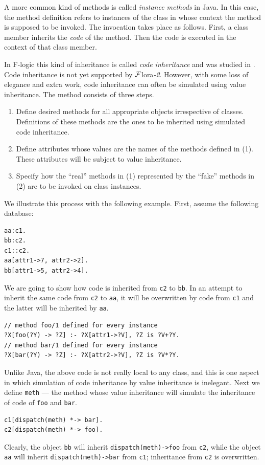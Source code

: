 \documentclass[11pt]{article}
\newcommand{\FLORA}{{\mbox{\sc ${\cal F}${lora}\rm\emph{-2}}}\xspace}
\newcommand{\fl}{\mbox{F-logic}\xspace}
\begin{document}
A more common kind of methods is called \emph{instance methods} in Java.
In this case, the method definition refers to instances of the class in
whose context the method is supposed to be invoked. The invocation takes
place as follows. First, a class member inherits the \emph{code} of the
method. Then the code is executed in the context of that class member.

In \fl this kind of inheritance is called \emph{code inheritance} and was
studied in \cite{code-inheritance-2003,kifer-yang-inheritance-2006}. Code inheritance is not yet
supported by \FLORA. However, with some loss of
elegance and extra work, code inheritance can often be simulated using value
inheritance. The method consists of three steps.
\begin{enumerate}
\item  Define desired methods for all appropriate objects irrespective of
  classes. Definitions of these methods are the ones to be inherited using
  simulated code inheritance.
\item Define attributes whose values are the names of the methods defined
  in (1).  These attributes will be subject to value inheritance.
\item  Specify how the ``real'' methods in (1) represented by
  the ``fake'' methods in (2) are to be invoked on class instances.
\end{enumerate}
We illustrate this process with the following example. First, assume the
following database:
\begin{verbatim}
aa:c1.
bb:c2.
c1::c2.
aa[attr1->7, attr2->2].
bb[attr1->5, attr2->4].  
\end{verbatim}
We are going to show how code is inherited from {\tt c2} to {\tt bb}. In
an attempt to inherit the same code from {\tt c2} to {\tt aa}, it
will be overwritten by code from {\tt c1} and the latter will be inherited
by {\tt aa}. 
\begin{verbatim}
// method foo/1 defined for every instance
?X[foo(?Y) -> ?Z] :- ?X[attr1->?V], ?Z is ?V+?Y.
// method bar/1 defined for every instance
?X[bar(?Y) -> ?Z] :- ?X[attr2->?V], ?Z is ?V*?Y.  
\end{verbatim}
Unlike Java, the above code is not really local to any class, and this is
one aspect in which simulation of code inheritance by value inheritance is
inelegant. Next we define {\tt meth} --- the method whose
value inheritance will simulate the inheritance of code of {\tt foo} and
{\tt bar}.   
\begin{verbatim}
c1[dispatch(meth) *-> bar].  
c2[dispatch(meth) *-> foo].
\end{verbatim}
Clearly, the object {\tt bb} will inherit {\tt dispatch(meth)->foo} from
{\tt c2},
while the object {\tt aa}    will inherit {\tt dispatch(meth)->bar} from
{\tt c1};
inheritance from {\tt c2} is overwritten.  
\end{document}
